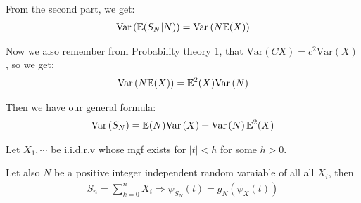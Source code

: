 \noindent From the second part, we get:
\begin{equation*}
  \begin{gathered}
    \text{Var}\left(\mathbb{E}(S_N|N)\right) = \text{Var}\left(N\mathbb{E}(X)\right)
  \end{gathered}
\end{equation*}\par
\noindent Now we also remember from Probability theory 1, that $\text{Var}\left(CX\right) = c^2\text{Var}\left(X\right)$, so we get:
\begin{equation*}
  \begin{gathered}
    \text{Var}\left(N\mathbb{E}(X)\right) = \mathbb{E}^2(X)\text{Var}\left(N\right)
  \end{gathered}
\end{equation*}\par
\noindent Then we have our general formula:
\begin{equation*}
  \begin{gathered}
    \text{Var}\left(S_N\right) = \mathbb{E}(N)\text{Var}\left(X\right) + \text{Var}\left(N\right)\mathbb{E}^2(X)
  \end{gathered}
\end{equation*}
\par\bigskip
\begin{theo}[]{}
  Let $X_1,\cdots$ be i.i.d.r.v whose mgf exists for $\left|t\right|<h$  for some $h>0$.\par
  \noindent Let also $N$ be a positive integer independent random varaiable of all all $X_i$, then 
  \begin{equation*}
    \begin{gathered}
      S_n = \sum_{k=0}^{n}X_i\Rightarrow \psi_{S_N}(t) = g_N(\psi_X(t))
    \end{gathered}
  \end{equation*}\par

\end{theo}
